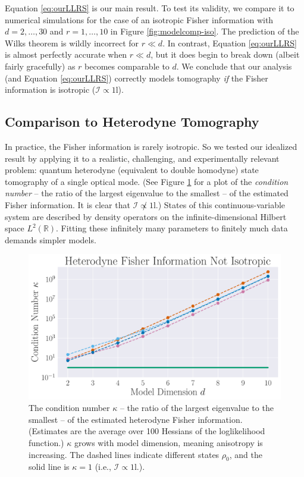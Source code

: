 \documentclass[aps,pra, twocolumn]{revtex4-1}
\newcommand{\reals}{\mathbb{R}}
\newcommand{\Id}{\mathbb{I}}
\def\Id{1\!\mathrm{l}}
\newcommand{\Fi}{\mathcal{I}}
\begin{document}
Equation \eqref{eq:ourLLRS} is our main result.  To test its validity, we compare it to numerical simulations for the case of an isotropic Fisher information
with $d=2,\ldots,30$ and $r=1,\ldots,10$ in Figure \ref{fig:modelcomp-iso}.  The prediction of the Wilks theorem is wildly incorrect for $r\ll d$. In contrast, Equation \eqref{eq:ourLLRS} is almost perfectly accurate when $r \ll d$, but it does begin to break down (albeit fairly gracefully) as $r$ becomes comparable to $d$.  We conclude that our analysis (and Equation \eqref{eq:ourLLRS}) correctly models tomography \emph{if} the Fisher information is isotropic ($\Fi \propto \Id$).


\subsection{Comparison to Heterodyne Tomography}
\label{sec:heterotomo}
In practice, the Fisher information is rarely isotropic.  So we tested our idealized result by applying it to a realistic, challenging, and experimentally relevant problem: quantum heterodyne (equivalent to double homodyne) state tomography \cite{Lvovsky2001a, Bertrand1987, Leonhardt1995, Lvovsky2009} of a single optical mode.  (See Figure \ref{fig:fish_condition} for a plot of the \emph{condition number} -- the ratio of the largest eigenvalue to the smallest -- of the estimated Fisher information. It is clear that $\mathcal{I} \not \propto \Id$.) States of this continuous-variable system are described by density operators on the infinite-dimensional Hilbert space $L^2(\reals)$.  Fitting these infinitely many parameters to finitely much data demands simpler models.

\begin{figure}[t]
  \includegraphics[width=.9\columnwidth]{Images/Figure_10.pdf}
 \caption{The condition number $\kappa$ -- the ratio of the largest eigenvalue to the smallest -- of the estimated heterodyne Fisher information. (Estimates are the average over 100 Hessians of the loglikelihood function.) $\kappa$ grows with model dimension, meaning anisotropy is increasing.  The dashed lines indicate different states $\rho_{0}$, and the solid line is $\kappa = 1$ (i.e., $\mathcal{I} \propto \Id$.).}
\label{fig:fish_condition}
\end{figure}
\end{document}
